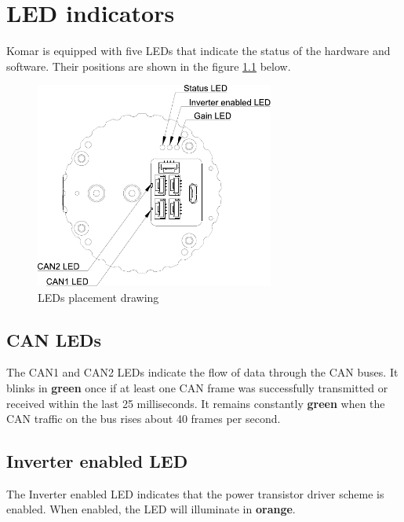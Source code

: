 
\chapter{LED indicators}

\newcommand{\LEDX}{{\rule{0.4em}{1.0em}}}
\newcommand{\LEDO}{{\rule{0.4em}{0.1em}}}

\newcommand{\ShowColor}[1]{{\color{#1}\rule{2em}{0.8em}}}

Komar is equipped with five LEDs that indicate the status of the hardware and software.
Their positions are shown in the figure \ref{fig:characteristics_leds_placement} below.

\begin{figure}[!hbt]
    \centering
    \includegraphics[width=0.7\textwidth]{figures/leds_placement}
    \caption{LEDs placement drawing\label{fig:characteristics_leds_placement}}
\end{figure}

\section{CAN LEDs}
The CAN1 and CAN2 LEDs indicate the flow of data through the CAN buses. It blinks in \textbf{green} once if
at least one CAN frame was successfully transmitted or received within the last 25 milliseconds. It
remains constantly \textbf{green} when the CAN traffic on the bus rises about 40 frames per second.

\section{Inverter enabled LED}
The Inverter enabled LED indicates that the power transistor driver scheme is enabled. When enabled, the LED
will illuminate in \textbf{orange}.

